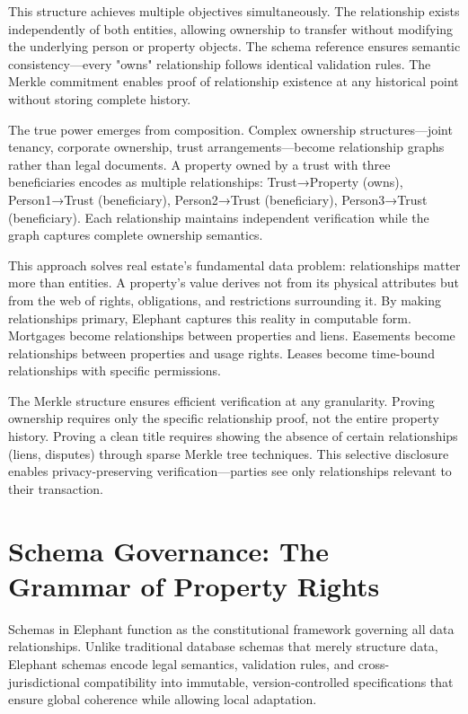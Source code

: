 This structure achieves multiple objectives simultaneously. The relationship exists independently of both entities, allowing ownership to transfer without modifying the underlying person or property objects. The schema reference ensures semantic consistency—every "owns" relationship follows identical validation rules. The Merkle commitment enables proof of relationship existence at any historical point without storing complete history.

The true power emerges from composition. Complex ownership structures—joint tenancy, corporate ownership, trust arrangements—become relationship graphs rather than legal documents. A property owned by a trust with three beneficiaries encodes as multiple relationships: Trust→Property (owns), Person1→Trust (beneficiary), Person2→Trust (beneficiary), Person3→Trust (beneficiary). Each relationship maintains independent verification while the graph captures complete ownership semantics.

This approach solves real estate's fundamental data problem: relationships matter more than entities. A property's value derives not from its physical attributes but from the web of rights, obligations, and restrictions surrounding it. By making relationships primary, Elephant captures this reality in computable form. Mortgages become relationships between properties and liens. Easements become relationships between properties and usage rights. Leases become time-bound relationships with specific permissions.

The Merkle structure ensures efficient verification at any granularity. Proving ownership requires only the specific relationship proof, not the entire property history. Proving a clean title requires showing the absence of certain relationships (liens, disputes) through sparse Merkle tree techniques. This selective disclosure enables privacy-preserving verification—parties see only relationships relevant to their transaction.

\section{Schema Governance: The Grammar of Property Rights}

Schemas in Elephant function as the constitutional framework governing all data relationships. Unlike traditional database schemas that merely structure data, Elephant schemas encode legal semantics, validation rules, and cross-jurisdictional compatibility into immutable, version-controlled specifications that ensure global coherence while allowing local adaptation.

